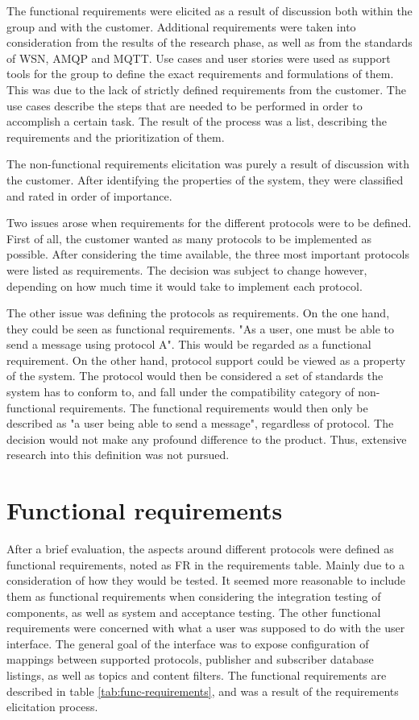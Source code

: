 The functional requirements were elicited as a result of discussion both within the group and with the customer. Additional requirements were taken into consideration from the results of the research phase, as well as from the standards of WSN, AMQP and MQTT. Use cases and user stories were used as support tools for the group to define the exact requirements and formulations of them. This was due to the lack of strictly defined requirements from the customer. The use cases describe the steps that are needed to be performed in order to accomplish a certain task. The result of the process was a list, describing the requirements and the prioritization of them.

The non-functional requirements elicitation was purely a result of discussion with the customer. After identifying the properties of the system, they were classified and rated in order of importance.

Two issues arose when requirements for the different protocols were to be defined. First of all, the customer wanted as many protocols to be implemented as possible. After considering the time available, the three most important protocols were listed as requirements. The decision was subject to change however, depending on how much time it would take to implement each protocol.

The other issue was defining the protocols as requirements. On the one hand, they could be seen as functional requirements. "As a user, one must be able to send a message using protocol A". This would be regarded as a functional requirement. On the other hand, protocol support could be viewed as a property of the system. The protocol would then be considered a set of standards the system has to conform to, and fall under the compatibility category of non-functional requirements. The functional requirements would then only be described as "a user being able to send a message", regardless of protocol. The decision would not make any profound difference to the product. Thus, extensive research into this definition was not pursued.

\section{Functional requirements}
\label{sec:requirements_engineering-functional_requirements}

After a brief evaluation, the aspects around different protocols were defined as functional requirements, noted as FR in the requirements table. Mainly due to a consideration of how they would be tested. It seemed more reasonable to include them as functional requirements when considering the integration testing of components, as well as system and acceptance testing. The other functional requirements were concerned with what a user was supposed to do with the user interface. The general goal of the interface was to expose configuration of mappings between supported protocols, publisher and subscriber database listings, as well as topics and content filters. The functional requirements are described in table \ref{tab:func-requirements}, and was a result of the requirements elicitation process.

